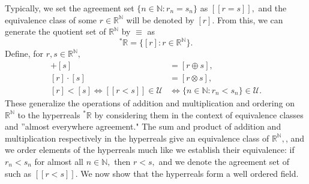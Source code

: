 \documentclass[12pt]{amsart}
\newcommand{\stt}{{}^*}
\newcommand{\NN}{\mathbb{N}}
\newcommand{\RR}{\mathbb{R}}
\newcommand{\mcU}{\mathcal{U}}
\theoremstyle{plain}
\theoremstyle{definition}
\theoremstyle{remark}
\theoremstyle{theorem}
\numberwithin{equation}{section}
\numberwithin{thm}{section}
\begin{document}
Typically, we set the agreement set $\{ n \in \NN : r_n = s_n\}$ as  $[[r = s]],$ and the equivalence class of some $r \in \RR^\NN$ will be denoted by $[r].$ From this, we can generate the quotient set of $\RR^\NN$ by $\equiv$ as 
\[^*\RR = \{[r] : r\in \RR^\NN\}.\]
Define, for $r,s \in \RR^\NN,$
\begin{align*}
    [r] +[s] &= [r \oplus s], \\
    [r]\cdot [s] &= [r\otimes s], \\
    [r] < [s] \iff [[r<s]] \in \mcU &\iff \{n\in \NN : r_n < s_n \} \in \mcU.
\end{align*}
These generalize the operations of addition and multiplication and ordering on $\RR^\NN$ to the hyperreals $\stt \RR$ by considering them in the context of equivalence classes and ''almost everywhere agreement." The sum and product of addition and multiplication respectively in the hyperreals give an equivalence class of $\RR^\NN,$, and we order elements of the hyperreals much like we establish their equivalence: if $r_n < s_n$ for almost all $n \in \NN,$ then $r < s,$ and we denote the agreement set of such as $[[r<s]].$ We now show that the hyperreals form a well ordered field.
\end{document}

